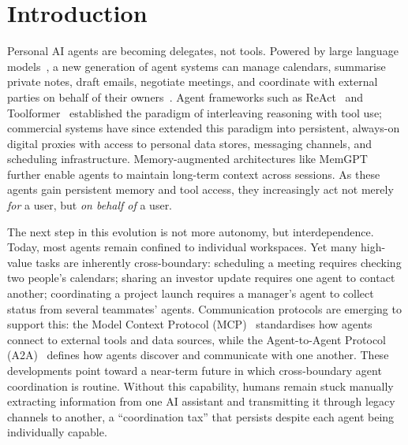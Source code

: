 \documentclass{article}
\begin{document}
\section{Introduction}
\label{sec:intro}

Personal AI agents are becoming delegates, not tools. Powered by large language models~\citep{openai2023gpt4, anthropic2024claude}, a new generation of agent systems can manage calendars, summarise private notes, draft emails, negotiate meetings, and coordinate with external parties on behalf of their owners~\citep{manus2025, devin2024}. Agent frameworks such as ReAct~\citep{yao2023react} and Toolformer~\citep{schick2023toolformer} established the paradigm of interleaving reasoning with tool use; commercial systems have since extended this paradigm into persistent, always-on digital proxies with access to personal data stores, messaging channels, and scheduling infrastructure. Memory-augmented architectures like MemGPT~\citep{packer2024memgpt} further enable agents to maintain long-term context across sessions. As these agents gain persistent memory and tool access, they increasingly act not merely \emph{for} a user, but \emph{on behalf of} a user.

The next step in this evolution is not more autonomy, but interdependence. Today, most agents remain confined to individual workspaces. Yet many high-value tasks are inherently cross-boundary: scheduling a meeting requires checking two people's calendars; sharing an investor update requires one agent to contact another; coordinating a project launch requires a manager's agent to collect status from several teammates' agents. Communication protocols are emerging to support this: the Model Context Protocol (MCP)~\citep{anthropic2024mcp} standardises how agents connect to external tools and data sources, while the Agent-to-Agent Protocol (A2A)~\citep{google2025a2a} defines how agents discover and communicate with one another. These developments point toward a near-term future in which cross-boundary agent coordination is routine. Without this capability, humans remain stuck manually extracting information from one AI assistant and transmitting it through legacy channels to another, a ``coordination tax'' that persists despite each agent being individually capable.
\end{document}
